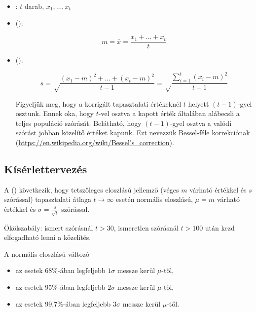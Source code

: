 \begin{definicio}
	\begin{itemize}
		\item {}: $t$ darab, $x_1, \dots, x_t$
		\item {} ():

		$$m = \bar{x} = \frac{x_1 + \dots + x_t}{t}$$

		\item {} ():

		$$s = \sqrt\frac{\left(x_1-m\right)^2 + \dots + \left(x_t-m\right)^2}{t-1} = \sqrt\frac{\sum_{i=1}^{t}\left(x_i - m\right)^2}{t-1}$$

		Figyeljük meg, hogy a korrigált tapasztalati értékeknél $t$ helyett $(t-1)$-gyel osztunk. Ennek oka, hogy $t$-vel osztva a kapott érték általában alábecsli a teljes populáció szórását. Belátható, hogy $(t-1)$-gyel osztva a valódi szórást jobban közelítő értéket kapunk. Ezt nevezzük Bessel-féle korrekciónak (\url{https://en.wikipedia.org/wiki/Bessel's\_correction}).
	\end{itemize}
\end{definicio}

\subsection{Kísérlettervezés}

A  () következik, hogy tetszőleges eloszlású jellemző (véges $m$ várható értékkel és $s$ szórással) tapasztalati átlaga $t \rightarrow \infty$ esetén normális eloszlású, $\mu = m$ várható értékkel és $\sigma = \frac{s}{\sqrt{t}}$ szórással.

Ökölszabály: ismert szórásnál $t > 30$, ismeretlen szórásnál $t > 100$ után kezd elfogadható lenni a közelítés.

A normális eloszlású változó
\begin{itemize}
	\item az esetek 68\%-ában legfeljebb $1\sigma$ messze kerül $\mu$-től,
	\item az esetek 95\%-ában legfeljebb $2\sigma$ messze kerül $\mu$-től,
	\item az esetek 99,7\%-ában legfeljebb $3\sigma$ messze kerül $\mu$-től.
\end{itemize}

